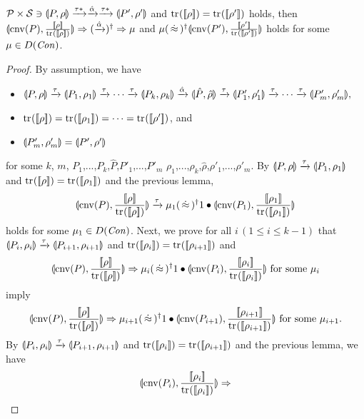 \begin{lem}
\label{symqccs:weak}
  $ \mathcal{P} \times \mathcal{S} \ni
\llparenthesis P, \rho \rrparenthesis \xrightarrow{\tau*} \xrightarrow{\hat \alpha} \xrightarrow{\tau*} \llparenthesis P', \rho' \rrparenthesis$ and
 ${\rm tr}_{}([\![\rho]\!]) =
 {\rm tr}_{}([\![\rho']\!])$ holds, then
 $\llparenthesis \mathrm{cnv}(P), \frac{[\![\rho]\!]}{{\rm tr}_{}([\![\rho]\!])} \rrparenthesis 
 \Rightarrow (\xrightarrow{\hat \alpha})^\dagger \Rightarrow 
 \mu$ and 
 $\mu (\,\dot\approx\,)^\dagger
 \llparenthesis \mathrm{cnv}(P'), \frac{[\![\rho']\!]}{{\rm tr}_{}([\![\rho']\!])} \rrparenthesis$
 holds
 for some $\mu \in D(\mathit{Con})$.
\end{lem}
\begin{proof}
\label{symqccs:prfofweak}
By assumption, we have
\begin{itemize}
 \item $\llparenthesis P, \rho \rrparenthesis \xrightarrow{\tau} \llparenthesis P_1, \rho_1 \rrparenthesis
       \xrightarrow{\tau} \cdots \xrightarrow{\tau} \llparenthesis P_k, \rho_k \rrparenthesis
       \xrightarrow{\hat \alpha} 
       \llparenthesis \hat P, \hat \rho \rrparenthesis
       \xrightarrow{\tau} \llparenthesis P'_1, \rho'_1 \rrparenthesis
       \xrightarrow{\tau} \cdots \xrightarrow{\tau} \llparenthesis P'_m, \rho'_m \rrparenthesis,$
 \item ${\rm tr}_{}([\![\rho]\!]) = {\rm tr}_{}([\![\rho_1]\!]) = 
       \cdots = {\rm tr}_{}([\![\rho']\!])$, and
 \item $\llparenthesis P'_m, \rho'_m \rrparenthesis = \llparenthesis P', \rho' \rrparenthesis$
\end{itemize}
for some $k$, $m$,
$P_1$,...,$P_k$,$\hat P$,$P'_1$,...,$P'_m$
$\rho_1$,...,$\rho_k$,$\hat \rho$,$\rho'_1$,...,$\rho'_m$.
By $\llparenthesis P, \rho \rrparenthesis \xrightarrow{\tau} \llparenthesis P_1, \rho_1 \rrparenthesis$ and
${\rm tr}_{}([\![\rho]\!]) = {\rm tr}_{}([\![\rho_1]\!])$
and the previous lemma, 
\[
 \con{\cnv{P}}{\frac{\braw{\rho}}{\tr{}{\braw{\rho}}}} 
 \xrightarrow{\tau} \mu_1 (\strg)^\dagger 
 1 \bullet \con{\cnv{P_1}}{\frac{\braw{\rho_1}}{\tr{}{\braw{\rho_1}}}} 
\]
holds for some $\mu_1 \in D(\mathit{Con})$. Next, we prove for all 
$i \, (1 \le i \le k-1)$ that 
$\llparenthesis P_i, \rho_i \rrparenthesis
\xrightarrow{\tau} \llparenthesis P_{i+1}, \rho_{i+1} \rrparenthesis$ and
${\rm tr}_{}([\![\rho_i]\!]) = {\rm tr}_{}([\![\rho_{i+1}]\!])$
and
\[
 \con{\cnv{P}}{\frac{\braw{\rho}}{\tr{}{\braw{\rho}}}} 
 \Rightarrow \mu_i (\strg)^\dagger 
 1 \bullet \con{\cnv{P_i}}{\frac{\braw{\rho_i}}{\tr{}{\braw{\rho_i}}}} 
 \mbox{ for some } \mu_i
\]
imply
\[
 \con{\cnv{P}}{\frac{\braw{\rho}}{\tr{}{\braw{\rho}}}} 
 \Rightarrow
 \mu_{i+1} (\strg)^\dagger 
 1 \bullet
 \con{\cnv{P_{i+1}}}{\frac{\braw{\rho_{i+1}}}{\tr{}{\braw{\rho_{i+1}}}}} 
 \mbox{ for some } \mu_{i+1}
 .
\]
By $\llparenthesis P_i, \rho_i \rrparenthesis
\xrightarrow{\tau} \llparenthesis P_{i+1}, \rho_{i+1} \rrparenthesis$ and
${\rm tr}_{}([\![\rho_i]\!]) = {\rm tr}_{}([\![\rho_{i+1}]\!])$ and the previous
lemma, we have 
\[
 \llparenthesis \mathrm{cnv}(P_i), \frac{[\![\rho_i]\!]}{{\rm tr}_{}([\![\rho_i]\!])} \rrparenthesis 
 \Rightarrow
\]
\end{proof}

